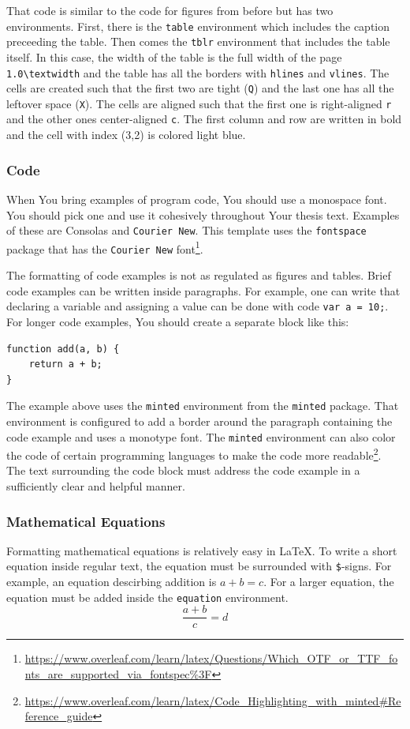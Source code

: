 That code is similar to the code for figures from before but has two environments. First, there is the \verb|table| environment which includes the caption preceeding the table. Then comes the \verb|tblr| environment that includes the table itself. In this case, the width of the table is the full width of the page \verb|1.0\textwidth| and the table has all the borders with \verb|hlines| and \verb|vlines|. The cells are created such that the first two are tight (\verb|Q|) and the last one has all the leftover space (\verb|X|). The cells are aligned such that the first one is right-aligned \verb|r| and the other ones center-aligned \verb|c|. The first column and row are written in bold and the cell with index (3,2) is colored light blue.

\subsubsection{Code}
When You bring examples of program code, You should use a monospace font. You should pick one and use it cohesively throughout Your thesis text. Examples of these are Consolas and \texttt{Courier New}. This template uses the \verb|fontspace| package that has the \texttt{Courier New} font\footnote{\url{https://www.overleaf.com/learn/latex/Questions/Which_OTF_or_TTF_fonts_are_supported_via_fontspec\%3F}}.

The formatting of code examples is not as regulated as figures and tables. Brief code examples can be written inside paragraphs. For example, one can write that declaring a variable and assigning a value can be done with code \verb|var a = 10;|. For longer code examples, You should create a separate block like this:

\begin{verbatim}
function add(a, b) {
    return a + b;
}
\end{verbatim}

The example above uses the \verb|minted| environment from the \verb|minted| package. That environment is configured to add a border around the paragraph containing the code example and uses a monotype font. The \verb|minted| environment can also color the code of certain programming languages to make the code more readable\footnote{\url{https://www.overleaf.com/learn/latex/Code_Highlighting_with_minted\#Reference_guide}}. The text surrounding the code block must address the code example in a sufficiently clear and helpful manner.

\subsubsection{Mathematical Equations}
Formatting mathematical equations is relatively easy in LaTeX. To write a short equation inside regular text, the equation must be surrounded with \verb|$|-signs. For example, an equation descirbing addition is $a+b=c$. For a larger equation, the equation must be added inside the \verb|equation| environment.
\begin{equation}
    \frac{a + b}{c} = d
    \label{eq:abcd}
\end{equation}

